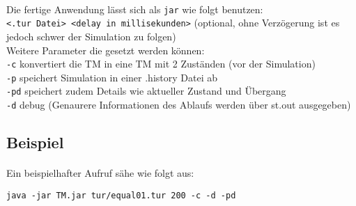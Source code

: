 \documentclass[10pt, a4paper]{article}
\newcommand{\ilc}{\texttt}
\begin{document}
\paragraph*{}
Die fertige Anwendung lässt sich als \ilc{jar} wie folgt benutzen:\\
\ilc{<.tur Datei> <delay in millisekunden>} (optional, ohne Verzögerung ist es jedoch schwer der Simulation zu folgen)\\
Weitere Parameter die gesetzt werden können:\\
\ilc{-c} konvertiert die TM in eine TM mit 2 Zuständen (vor der Simulation)\\
\ilc{-p} speichert Simulation in einer .history Datei ab\\
\ilc{-pd} speichert zudem Details wie aktueller Zustand und Übergang\\
\ilc{-d} debug (Genaurere Informationen des Ablaufs werden über st.out ausgegeben)

\subsection*{Beispiel}
\paragraph*{}
Ein beispielhafter Aufruf sähe wie folgt aus:\par

\begin{tcolorbox}
\begin{verbatim}
java -jar TM.jar tur/equal01.tur 200 -c -d -pd
\end{verbatim}
\end{tcolorbox}
\end{document}
